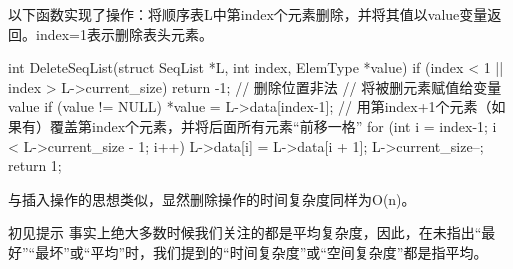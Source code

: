 以下函数实现了操作：将顺序表L中第index个元素删除，并将其值以value变量返回。index=1表示删除表头元素。
\begin{cppcode}
    int DeleteSeqList(struct SeqList *L, int index, ElemType *value) {
    if (index < 1 || index > L->current_size) {
        return -1; // 删除位置非法
    }
    // 将被删元素赋值给变量value
    if (value != NULL) {
        *value = L->data[index-1];
    }
    // 用第index+1个元素（如果有）覆盖第index个元素，并将后面所有元素“前移一格”
    for (int i = index-1; i < L->current_size - 1; i++) {
        L->data[i] = L->data[i + 1];
    }
    L->current_size--;
    return 1;
}
\end{cppcode}
与插入操作的思想类似，显然删除操作的时间复杂度同样为O(n)。
\begin{notebox}{初见提示}
    事实上绝大多数时候我们关注的都是平均复杂度，因此，在未指出“最好”“最坏”或“平均”时，我们提到的“时间复杂度”或“空间复杂度”都是指平均。
\end{notebox}
